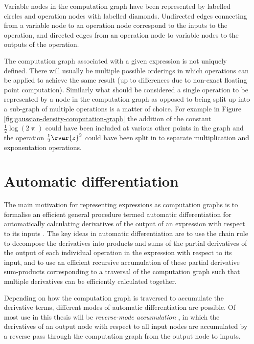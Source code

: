 Variable nodes in the computation graph have been represented by labelled circles and operation nodes with labelled diamonds. Undirected edges connecting from a variable node to an operation node correspond to the inputs to the operation, and directed edges from an operation node to variable nodes to the outputs of the operation.

The computation graph associated with a given expression is not uniquely defined. There will usually be multiple possible orderings in which operations can be applied to achieve the same result (up to differences due to non-exact floating point computation). Similarly what should be considered a single operation to be represented by a node in the computation graph as opposed to being split up into a sub-graph of multiple operations is a matter of choice. For example in Figure \ref{fig:gaussian-density-computation-graph} the addition of the constant $\frac{1}{2}\log(2\uppi)$ could have been included at various other points in the graph and the operation $\frac{1}{2}\rvar{z}^2$ could have been split in to separate multiplication and exponentation operations.

\section{Automatic differentiation}\label{sec:automatic-differentiation}

The main motivation for representing expressions as computation graphs is to formalise an efficient general procedure termed automatic differentiation for automatically calculating derivatives of the output of an expression with respect to its inputs \citep{nolan1953analytical,beda1959programs}. The key ideas in automatic differentiation are to use the chain rule to decompose the derivatives into products and sums of the partial derivatives of the output of each individual operation in the expression with respect to its input, and to use an efficient recursive accumulation of these partial derivative sum-products corresponding to a traversal of the computation graph such that multiple derivatives can be efficiently calculated together.

Depending on how the computation graph is traversed to accumulate the derivative terms, different modes of automatic differentiation are possible. Of most use in this thesis will be \emph{reverse-mode accumulation} \citep{speelpenning1980compiling}, in which the derivatives of an output node with respect to all input nodes are accumulated by a reverse pass through the computation graph from the output node to inputs.

